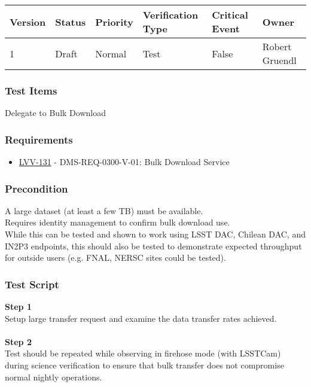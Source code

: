 \begin{longtable}[]{@{}llllll@{}}
\toprule
Version & Status & Priority & Verification Type & Critical Event &
Owner\tabularnewline
\midrule
\endhead
1 & Draft & Normal & Test & False & Robert Gruendl\tabularnewline
\bottomrule
\end{longtable}

\hypertarget{test-items-114}{%
\subsubsection{Test Items}\label{test-items-114}}

Delegate to Bulk Download

\hypertarget{requirements-115}{%
\subsubsection{Requirements}\label{requirements-115}}

\begin{itemize}
\tightlist
\item
  \href{https://jira.lsstcorp.org/browse/LVV-131}{LVV-131} -
  DMS-REQ-0300-V-01: Bulk Download Service
\end{itemize}

\hypertarget{precondition-16}{%
\subsubsection{Precondition}\label{precondition-16}}

A large dataset (at least a few TB) must be available.\\
Requires identity management to confirm bulk download use.\\
While this can be tested and shown to work using LSST DAC, Chilean DAC,
and IN2P3 endpoints, this should also be tested to demonstrate expected
throughput for outside users (e.g. FNAL, NERSC sites could be tested).

\hypertarget{test-script-115}{%
\subsubsection{Test Script}\label{test-script-115}}

\textbf{Step 1}\\
Setup large transfer request and examine the data transfer rates
achieved.\\
~\\
\textbf{Step 2}\\
Test should be repeated while observing in firehose mode (with LSSTCam)
during science verification to ensure that bulk transfer does not
compromise normal nightly operations.\\
~\\

